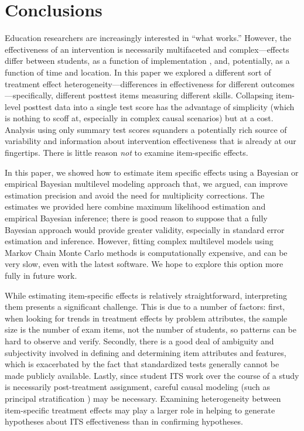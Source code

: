 \documentclass{edm_article}
\begin{document}
\section{Conclusions}\label{sec:conclusion}

Education researchers are increasingly interested in ``what works.''
However, the effectiveness of an intervention is necessarily
multifaceted and complex---effects differ between students, as a
function of implementation \cite{sales2016student}, and, potentially,
as a function of time and location.
In this paper we explored a different sort of treatment effect
heterogeneity---differences in effectiveness for different
outcomes---specifically, different posttest items measuring different
skills.
Collapsing item-level posttest data into a single test score has the
advantage of simplicity (which is nothing to scoff at, especially in
complex causal scenarios) but at a cost.
Analysis using only summary test scores squanders a potentially rich
source of variability and information about intervention effectiveness
that is already at our fingertips.
There is little reason \emph{not} to examine item-specific effects.

In this paper, we showed how to estimate item specific effects using a
Bayesian or empirical Bayesian multilevel modeling approach that, we
argued, can improve estimation precision and avoid the need for
multiplicity corrections.
The estimates we provided here combine maximum likelihood estimation
and empirical Bayesian inference; there is good reason to suppose that
a fully Bayesian approach would provide greater validity, especially
in standard error estimation and inference.
However, fitting complex multilevel models using Markov Chain Monte
Carlo methods is computationally expensive, and can be very slow, even
with the latest software.
We hope to explore this option more fully in future work.

While estimating item-specific effects is relatively straightforward,
interpreting them presents a significant challenge.
This is due to a number of factors: first, when looking for trends in
treatment effects by problem attributes, the sample size is the number
of exam items, not the number of students, so patterns can be hard to
observe and verify.
Secondly, there is a good deal of ambiguity and subjectivity involved
in defining and determining item attributes and features, which is
exacerbated by the fact that standardized tests generally cannot be
made publicly available.
Lastly, since student ITS work over the course of a study is
necessarily post-treatment assignment, careful causal modeling (such
as principal stratification \cite{sales2016student}) may be necessary.
Examining heterogeneity between item-specific treatment effects may
play a larger role in helping to generate hypotheses about ITS
effectiveness than in confirming hypotheses.
\end{document}
